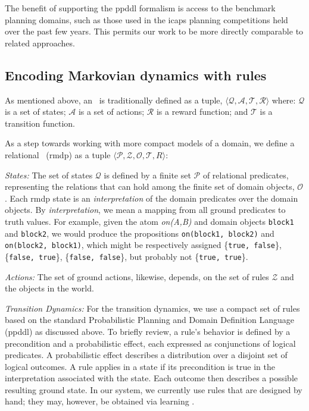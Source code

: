 The benefit of supporting the {\sc ppddl} formalism is access
to the benchmark planning domains, such as those used in the {\sc icaps} 
 planning competitions held over the past few years. This permits our
work to be more directly comparable to related approaches.



\subsection{Encoding Markovian dynamics with rules}\label{rmdpdef}



As mentioned above, an \mdp\ is traditionally defined as a tuple, $\langle
\mathcal{Q,A,T,R}\rangle$ where: $\mathcal{Q}$ is a set of states;
$\mathcal{A}$ is a set of
actions; $\mathcal{R}$ is a reward function;
and $\mathcal{T}$ is a transition function.    

As a step towards working with more compact models of a domain, we 
define a relational \mdp\ ({\sc rmdp}) as a tuple $\langle \mathcal{P,Z,O,T,}\mathit{R} \rangle$:

\emph{States:} The set of states $\mathcal{Q}$ is defined by a finite set
$\mathcal{P}$ of relational predicates, representing the 
relations that can hold among the finite set of domain objects,
$\mathcal{O}$. Each {\sc rmdp} state is an \emph{interpretation}
of the domain predicates over the domain objects. By \emph{interpretation}, 
we mean a mapping from all ground predicates  to truth values. For example,
given the atom \emph{on(A,B)} and domain objects {\tt block1} and
{\tt block2}, we would produce the propositions {\tt on(block1,
block2)} and {\tt on(block2, block1)}, which might be respectively
assigned \{{\tt true, false}\}, \{{\tt false, true}\}, \{{\tt false,
false}\}, but probably not \{{\tt true, true}\}.
 

\emph{Actions:} The set of ground actions, likewise, depends, on the
  set of rules $\mathcal{Z}$ and the objects in the world. 
  
\emph{Transition Dynamics:} For the transition dynamics, we use a
compact set of rules based on the standard Probabilistic Planning and
Domain Definition Language ({\sc ppddl}) \cite{younes03} as discussed above.
To briefly review,  a rule's
behavior is defined by a precondition and a probabilistic effect, each
expressed as conjunctions of logical predicates. A probabilistic
effect describes a distribution over a disjoint set of logical
outcomes.  A rule applies in a state if its precondition is true in
the interpretation associated with the state.
  Each outcome then describes a possible resulting ground
state.  In our system, we currently use rules that are designed by
hand; they may, however, be obtained via learning
\cite{zettlemoyer05aaai,pasula07}.


